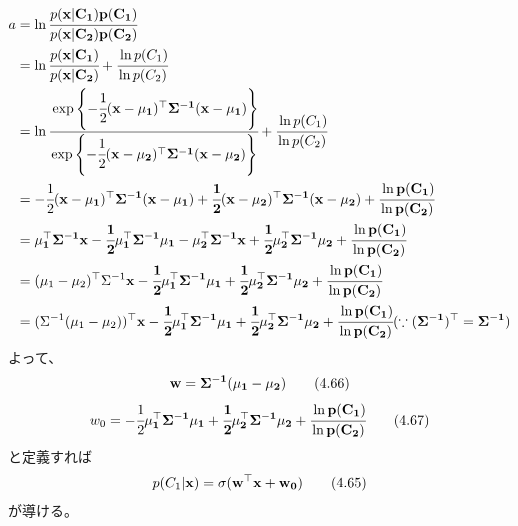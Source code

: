 \documentclass{jsarticle}
\begin{document}
\begin{align*}
    a
    &= \ln \cfrac{p(\bf x | C_1)p(C_1)}{p(\bf x | C_2)p(C_2)} \\
    &= \ln \cfrac{p(\bf x | C_1)}{p(\bf x | C_2)} + \cfrac{\ln p(C_1)}{\ln p(C_2)} \\
    &= \ln \cfrac{\exp \left\{ -\cfrac{1}{2} (\bf x - \bf{\mu}_1)^\top \Sigma^{-1} (\bf x - \bf \mu_1) \right\}}{\exp \left\{ -\cfrac{1}{2} (\bf x - \bf{\mu}_2)^\top \Sigma^{-1} (\bf x - \bf \mu_2) \right\}} + \cfrac{\ln p(C_1)}{\ln p(C_2)} \\
    &=  -\cfrac{1}{2} (\bf x - \bf{\mu}_1)^\top \Sigma^{-1} (\bf x - \bf \mu_1) + \cfrac{1}{2} (\bf x - \bf{\mu}_2)^\top \Sigma^{-1} (\bf x - \bf \mu_2) + \cfrac{\ln p(C_1)}{\ln p(C_2)} \\
    &= \bf \mu_1^{\top} \Sigma^{-1} \bf x - \cfrac{1}{2} \bf \mu_1^{\top} \Sigma^{-1}\bf \mu_1 - \bf \mu_2^{\top} \Sigma^{-1} \bf x + \cfrac{1}{2} \bf \mu_2^{\top} \Sigma^{-1}\bf \mu_2 + \cfrac{\ln p(C_1)}{\ln p(C_2)} \\
    &= (\mu_1 - \mu_2)^{\top} \Sigma^{-1} \bf x - \cfrac{1}{2} \bf \mu_1^{\top} \Sigma^{-1}\bf \mu_1 + \cfrac{1}{2} \bf \mu_2^{\top} \Sigma^{-1}\bf \mu_2 + \cfrac{\ln p(C_1)}{\ln p(C_2)} \\
    &= (\Sigma^{-1}(\mu_1 - \mu_2))^{\top} \bf x - \cfrac{1}{2} \bf \mu_1^{\top} \Sigma^{-1}\bf \mu_1 + \cfrac{1}{2} \bf \mu_2^{\top} \Sigma^{-1}\bf \mu_2 + \cfrac{\ln p(C_1)}{\ln p(C_2)} (\because (\Sigma^{-1})^{\top} = \Sigma^{-1}) \\
\end{align*}
よって、
\begin{align*}
    \bf w = \Sigma^{-1}(\mu_1 - \mu_2) \tag{4.66}
\end{align*}
\begin{align*}
    w_0 = - \cfrac{1}{2} \bf \mu_1^{\top} \Sigma^{-1}\bf \mu_1 + \cfrac{1}{2} \bf \mu_2^{\top} \Sigma^{-1}\bf \mu_2 + \cfrac{\ln p(C_1)}{\ln p(C_2)} \tag{4.67}
\end{align*}
と定義すれば
\begin{align*}
    p(C_1 |\bf x) = \sigma (\bf w^{\top} \bf x + w_0) \tag{4.65}
\end{align*}
が導ける。
\end{document}

